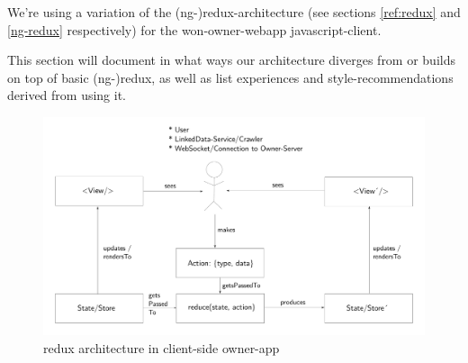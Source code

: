 

We're using a variation of the (ng-)redux-architecture (see sections \ref{ref:redux} and \ref{ng-redux} respectively) for the won-owner-webapp javascript-client.

This section will document in what ways our architecture diverges from or
builds on top of basic (ng-)redux, as well as list experiences and
style-recommendations derived from using it. %

\begin{figure}
\centering
\includegraphics[width=1.0\textwidth]{figures/owner_app_redux_architecture.pdf}
\caption{\label{fig:adapted-redux}redux architecture in client-side owner-app}
\end{figure}

